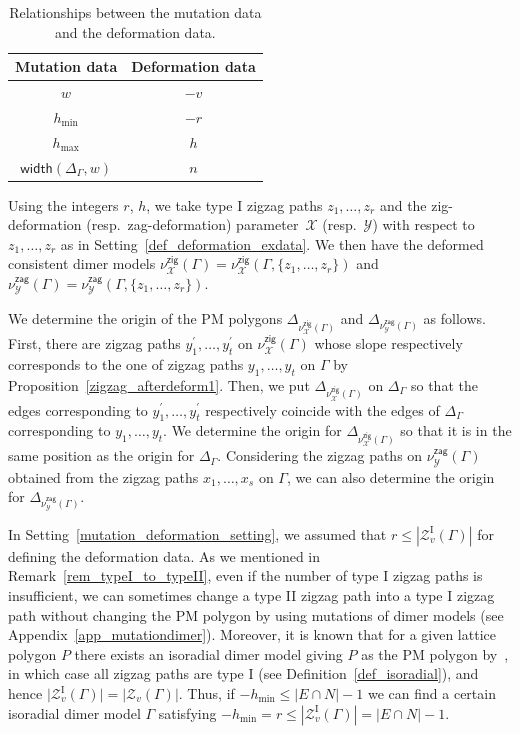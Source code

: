 \documentclass[pdftex]{sigma}%
\numberwithin{equation}{section}
\numberwithin{figure}{section}
\numberwithin{table}{section}
\newcommand{\rmI}{\mathrm{I}}
\newcommand{\calX}{\mathcal{X}}
\newcommand{\calY}{\mathcal{Y}}
\newcommand{\calZ}{\mathcal{Z}}
\newcommand{\zig}{\mathsf{zig}}
\newcommand{\zag}{\mathsf{zag}}
\newcommand{\width}{\mathsf{width}}
\begin{document}
\begin{setting}
\begin{table}[h!]\centering
\begin{tabular}{|c|c|}
\hline
Mutation data&Deformation data \\ \hline
$w$&$-v$ \\ \hline
$h_{\min}$&$-r$\\ \hline
$h_{\max}$&$h$ \\ \hline
$\width(\Delta_\Gamma,w)$&$n$ \\ \hline
\end{tabular}

\caption{Relationships between the mutation data and the deformation data.}\label{mutation_deformation_data}
\end{table}

Using the integers $r$, $h$, we take type I zigzag paths $z_1,\dots,z_r$ and the zig-deformation (resp.\ zag-deformation) parameter~$\calX$ (resp.~$\calY$) with respect to $z_1,\dots,z_r$ as in Setting~\ref{def_deformation_exdata}.
We then have the deformed consistent dimer models $\nu^\zig_\calX(\Gamma)=\nu^\zig_\calX(\Gamma, \{z_1,\dots,z_r\})$
and $\nu^\zag_\calY(\Gamma)=\nu^\zag_\calY(\Gamma, \{z_1,\dots,z_r\})$.

We determine the origin of the PM polygons $\Delta_{\nu^\zig_\calX(\Gamma)}$ and $\Delta_{\nu^\zag_\calY(\Gamma)}$ as follows.
First, there are zigzag paths $y_1^\prime,\dots,y_t^\prime$ on $\nu^\zig_\calX(\Gamma)$ whose slope respectively corresponds to the one of zigzag paths $y_1,\dots, y_t$ on $\Gamma$ by Proposition~\ref{zigzag_afterdeform1}.
Then, we put $\Delta_{\nu^\zig_\calX(\Gamma)}$ on $\Delta_\Gamma$ so that the edges corresponding to $y_1^\prime,\dots,y_t^\prime$ respectively coincide with the edges of $\Delta_\Gamma$ corresponding to $y_1,\dots,y_t$.
We determine the origin for $\Delta_{\nu^\zig_\calX(\Gamma)}$ so that it is in the same position as the origin for $\Delta_\Gamma$.
Considering the zigzag paths on $\nu^\zag_\calY(\Gamma)$ obtained from the zigzag paths $x_1,\dots,x_s$ on $\Gamma$,
we can also determine the origin for $\Delta_{\nu^\zag_\calY(\Gamma)}$.
\end{setting}

\begin{Remark}
\label{rem_typeI_isoradial}
In Setting~\ref{mutation_deformation_setting}, we assumed that $r\le|\calZ_v^\rmI(\Gamma)|$ for defining the deformation data.
As we mentioned in Remark~\ref{rem_typeI_to_typeII}, even if the number of type I zigzag paths is insufficient,
we can sometimes change a type II zigzag path into a type I zigzag path without changing the PM polygon by using mutations of dimer models (see Appendix~\ref{app_mutationdimer}).
Moreover, it is known that for a given lattice polygon $P$ there exists an isoradial dimer model giving $P$ as the PM polygon by~\cite{Gul}, in which case all zigzag paths are type I (see Definition~\ref{def_isoradial}), and hence $\big|\calZ_v^\rmI(\Gamma)\big|=|\calZ_v(\Gamma)|$.
Thus, if $-h_{\min}\le|E\cap N|-1$ we can find a certain isoradial dimer model $\Gamma$ satisfying $-h_{\min}=r\le|\calZ_v^{\rmI}(\Gamma)|=|E\cap N|-1$.
\end{Remark}
\end{document}

